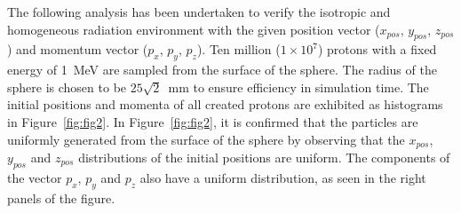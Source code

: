 \documentclass{jkas}
\begin{document}
The following analysis has been undertaken to verify the isotropic and homogeneous radiation environment with the given position vector ($x_{pos}$, $y_{pos}$, $z_{pos}$) and momentum vector ($p_x$, $p_y$, $p_z$). Ten million ($1\times10^7$) protons with a fixed energy of 1~MeV are sampled from the surface of the sphere. The radius of the sphere is chosen to be $25\sqrt2$~mm to ensure efficiency in simulation time. The initial positions and momenta of all created protons are exhibited as histograms in Figure~\ref{fig:fig2}. In Figure~\ref{fig:fig2}, it is confirmed that the particles are uniformly generated from the surface of the sphere by observing that the $x_{pos}$, $y_{pos}$ and $z_{pos}$ distributions of the initial positions are uniform. The components of the vector $p_x$, $p_y$ and $p_z$ also have a uniform distribution, as seen in the right panels of the figure.
\end{document}
